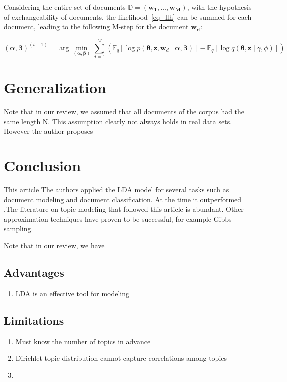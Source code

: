 \documentclass[12pt,a4paper,onecolumn]{article}
\begin{document}
Considering the entire set of documents \(\mathbb{D} = (\bm{w_1}, \dots, \bm{w_M})\), with the hypothesis of exchangeability of documents, the likelihood~\eqref{eq_llh} can be summed for each document, leading to the following M-step for the document \(\bm{w_d}\):

\begin{equation}
	(\bm{\alpha}, \bm{\beta})^{(t+1)} = \operatorname{arg}\min_{(\bm{\alpha}, \bm{\beta})} \sum_{d=1}^M\left(\mathbb{E}_{q}\left[\log p(\bm{\theta},\bm{z}, \bm{w}_d \mid \bm{\alpha}, \bm{\beta})\right] - \mathbb{E}_{q}\left[\log q(\bm{\theta}, \bm{z} \mid \gamma, \phi)\right]\right)          \tag{M-step}
\end{equation}


\section{Generalization}

Note that in our review, we assumed that all documents of the corpus had the same length N. This assumption clearly not always holds in real data sets. However the author proposes

\section{Conclusion}
This article
The authors applied the LDA model for several tasks such as document modeling and document classification. At the time it outperformed .The literature on topic modeling that followed this article is abundant. Other approximation techniques have proven to be successful, for example Gibbs sampling.

Note that in our review, we have




\subsection{Advantages}

\begin{enumerate}
	\item LDA is an effective tool for modeling
\end{enumerate}

\subsection{Limitations}

\begin{enumerate}
	\item Must know the number of topics in advance
	\item Dirichlet topic distribution cannot capture correlations among topics
	\item
\end{enumerate}




\printbibliography
\end{document}
